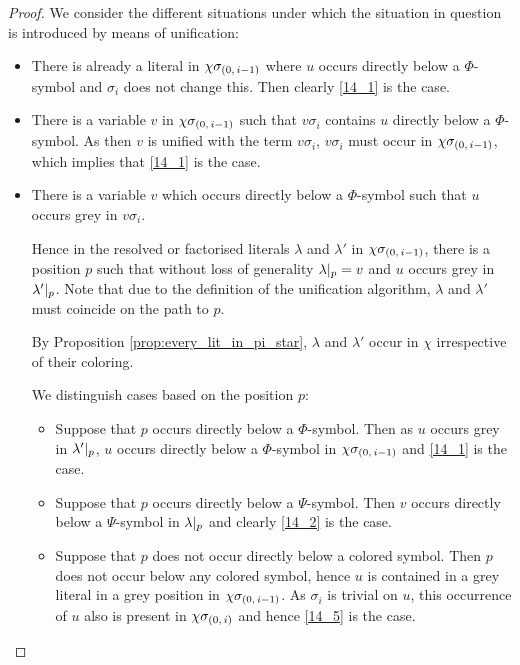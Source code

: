 \documentclass[,%
	draft=false,%
	numbers=noendperiod
	12pt,
	a4paper,
	oneside,%
	openany,
]{memoir}
\newcommand{\inv}{\ensuremath{\chi}}
\begin{document}
\begin{proof}
	We consider the different situations under which the situation in question is introduced by means of unification: 

	\begin{itemize}
		\item
			There is already a literal in $\inv\sigmazmi$ where $u$ occurs directly below a $\Phi$-symbol and $\sigma_i$ does not change this.
			Then clearly \ref{14_1} is the case.

		\item
			There is a variable $v$ in $\inv\sigmazmi$ such that $v\sigma_i$ contains $u$ directly below a $\Phi$-symbol.
			As then $v$ is unified with the term $v\sigma_i$, $v\sigma_i$ must occur in $\inv\sigmazmi$, which implies that \ref{14_1} is the case.

		\item
			There is a variable $v$ which occurs directly below a $\Phi$-symbol such that $u$ occurs grey in $v\sigma_i$.

			Hence in the resolved or factorised literals $\lambda$ and $\lambda'$ in $\inv\sigmazmi$, there is a position $p$ such that without loss of generality $\lambda|_{p} = v$ and $u$ occurs grey in $\lambda'|_{p}$. 
			Note that due to the definition of the unification algorithm, $\lambda$ and $\lambda'$ must coincide on the path to $p$.

			By Proposition \ref{prop:every_lit_in_pi_star}, $\lambda$ and $\lambda'$ occur in $\inv$ irrespective of their coloring.

			We distinguish cases based on the position $p$:

			\begin{itemize}
				\item Suppose that $p$ occurs directly below a $\Phi$-symbol.
					Then as $u$ occurs grey in  $\lambda'|_{p}$, $u$ occurs directly below a $\Phi$-symbol in $\inv\sigmazmi$ and \ref{14_1} is the case.

				\item Suppose that $p$ occurs directly below a $\Psi$-symbol.
					Then $v$ occurs directly below a $\Psi$-symbol in $\lambda|_{p}$ and clearly \ref{14_2} is the case.

				\item
					Suppose that $p$ does not occur directly below a colored symbol.
					Then $p$ does not occur below any colored symbol, hence $u$ is contained in a grey literal in a grey position in $\inv\sigmazmi$. 
					As $\sigma_i$ is trivial on $u$, this occurrence of $u$ also is present in $\inv\sigmazi$ and hence \ref{14_5} is the case.
					\qedhere

			\end{itemize}
	\end{itemize}

\end{proof}
\end{document}
